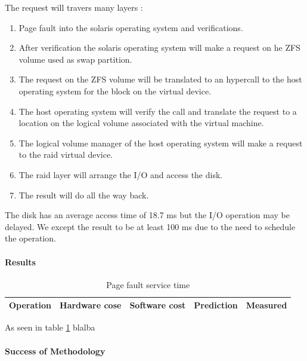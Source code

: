 The request will travers many layers :
\begin{enumerate}
\item Page fault into the solaris operating system and verifications.
\item After verification the solaris operating system will make a request on
he ZFS volume used as swap partition.
\item The request on the ZFS volume will be translated to an hypercall to the
host operating system for the block on the virtual device.
\item The host operating system will verify the call and translate the request
to a location on the logical volume associated with the virtual machine.
\item The logical volume manager of the host operating system will make a
request to the raid virtual device.
\item The raid layer will arrange the I/O and access the disk.
\item The result will do all the way back.
\end{enumerate}

The disk has an average access time of 18.7 ms but the I/O operation may be
delayed.
We except the result to be at least 100 ms due to the need to schedule the
operation.

\paragraph{Results}
\begin{table}[h]
\begin{center}
\begin{tabular}{| l | l | l | l | l |}
\hline
Operation & Hardware cose & Software cost & Prediction & Measured \\
\hline
\end{tabular}
\end{center}
\caption{Page fault service time}
\label{fig:page-fault}
\end{table}

As seen in table \ref{fig:page-fault} blalba
\paragraph{Success of Methodology}

